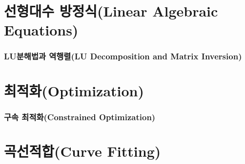 \documentclass{article}
\numberwithin{equation}{section}
\numberwithin{figure}{section}
\numberwithin{table}{section}
\numberwithin{algorithm}{section}
\theoremstyle{examplestyle}
\let\\\tabularnewline
\let\\\tabularnewline
\begin{document}
\clearpage
\part{선형대수 방정식\\(Linear Algebraic Equations)}


\clearpage
\section{LU분해법과 역행렬\\(LU Decomposition and Matrix Inversion)}


\clearpage
\part{최적화\\(Optimization)}


\clearpage
\section{구속 최적화\\(Constrained Optimization)}


\clearpage
\part{곡선적합\\(Curve Fitting)}


\clearpage
\end{document}
